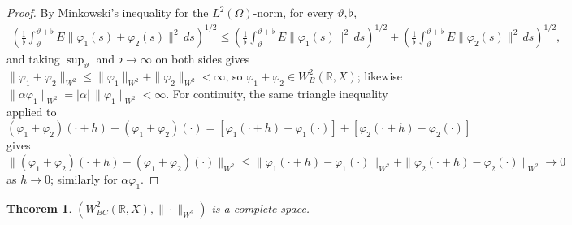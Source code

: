 \documentclass[10pt,a4paper]{amsart}
\newtheorem{theorem}{Theorem}[section]
\begin{document}
\begin{proof}
By Minkowski's inequality for the $L^2(\Omega)$-norm, for every $\vartheta,\flat$,
\begin{align*}
\left(\frac1\flat\int_\vartheta^{\vartheta+\flat}E\|\varphi_1(s)+\varphi_2(s)\|^2\,ds\right)^{1/2}\le\left(\frac1\flat\int_\vartheta^{\vartheta+\flat}E\|\varphi_1(s)\|^2\,ds\right)^{1/2}+\left(\frac1\flat\int_\vartheta^{\vartheta+\flat}E\|\varphi_2(s)\|^2\,ds\right)^{1/2},
\end{align*}
and taking $\sup_\vartheta$ and $\flat\to\infty$ on both sides gives $\|\varphi_1+\varphi_2\|_{W^2}\le\|\varphi_1\|_{W^2}+\|\varphi_2\|_{W^2}<\infty$, so $\varphi_1+\varphi_2\in W^2_B(\mathbb R,X)$; likewise $\|\alpha\varphi_1\|_{W^2}=|\alpha|\,\|\varphi_1\|_{W^2}<\infty$. For continuity, the same triangle inequality applied to $(\varphi_1+\varphi_2)(\cdot+h)-(\varphi_1+\varphi_2)(\cdot)=[\varphi_1(\cdot+h)-\varphi_1(\cdot)]+[\varphi_2(\cdot+h)-\varphi_2(\cdot)]$ gives $\|(\varphi_1+\varphi_2)(\cdot+h)-(\varphi_1+\varphi_2)(\cdot)\|_{W^2}\le\|\varphi_1(\cdot+h)-\varphi_1(\cdot)\|_{W^2}+\|\varphi_2(\cdot+h)-\varphi_2(\cdot)\|_{W^2}\to0$ as $h\to0$; similarly for $\alpha\varphi_1$.
\end{proof}

\begin{theorem}\label{BCcomplete}
$(W^2_{BC}(\mathbb R,X),\|\cdot\|_{W^2})$ is a complete space.
\end{theorem}
\end{document}
